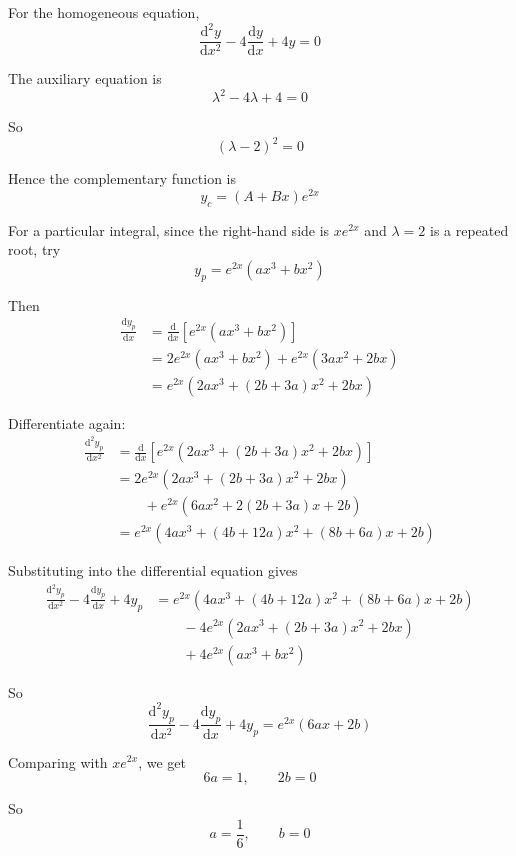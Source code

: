 \documentclass[leqno]{article}
\begin{document}
\begin{enumerate}[
  label=\textbf{\arabic*.},
  leftmargin=*,
  topsep=0pt,
  partopsep=0pt,
  parsep=0pt
]
\vspace*{30pt}

\begin{tcolorbox}[colback=white, colframe=scarlet, title={\textbf{Solution}}, breakable, grow to left by=6mm, grow to right by=10mm]
For the homogeneous equation,
\[
\frac{\mathrm{d}^2 y}{\mathrm{d}x^2}-4\frac{\mathrm{d}y}{\mathrm{d}x}+4y=0
\]

The auxiliary equation is
\[
\lambda^2-4\lambda+4=0
\]

So
\[
(\lambda-2)^2=0
\]

Hence the complementary function is
\[
y_c=(A+Bx)e^{2x}
\]

For a particular integral, since the right-hand side is $xe^{2x}$ and $\lambda=2$ is a repeated root, try
\[
y_p=e^{2x}(ax^3+bx^2)
\]

Then
\begin{align*}
\frac{\mathrm{d}y_p}{\mathrm{d}x}
&= \frac{\mathrm{d}}{\mathrm{d}x}\left[e^{2x}(ax^3+bx^2)\right] \\
&= 2e^{2x}(ax^3+bx^2)+e^{2x}(3ax^2+2bx) \\
&= e^{2x}\left(2ax^3+(2b+3a)x^2+2bx\right)
\end{align*}

Differentiate again:
\begin{align*}
\frac{\mathrm{d}^2y_p}{\mathrm{d}x^2}
&= \frac{\mathrm{d}}{\mathrm{d}x}\left[e^{2x}\left(2ax^3+(2b+3a)x^2+2bx\right)\right] \\
&= 2e^{2x}\left(2ax^3+(2b+3a)x^2+2bx\right) \\
&\qquad +e^{2x}\left(6ax^2+2(2b+3a)x+2b\right) \\
&= e^{2x}\left(4ax^3+(4b+12a)x^2+(8b+6a)x+2b\right)
\end{align*}

Substituting into the differential equation gives
\begin{align*}
\frac{\mathrm{d}^2y_p}{\mathrm{d}x^2}-4\frac{\mathrm{d}y_p}{\mathrm{d}x}+4y_p
&= e^{2x}\left(4ax^3+(4b+12a)x^2+(8b+6a)x+2b\right) \\
&\qquad -4e^{2x}\left(2ax^3+(2b+3a)x^2+2bx\right) \\
&\qquad +4e^{2x}(ax^3+bx^2)
\end{align*}

So
\[
\frac{\mathrm{d}^2y_p}{\mathrm{d}x^2}-4\frac{\mathrm{d}y_p}{\mathrm{d}x}+4y_p
=e^{2x}(6ax+2b)
\]

Comparing with $xe^{2x}$, we get
\[
6a=1, \qquad 2b=0
\]

So
\[
a=\frac{1}{6}, \qquad b=0
\]


\end{tcolorbox}
\end{enumerate}
\end{document}
